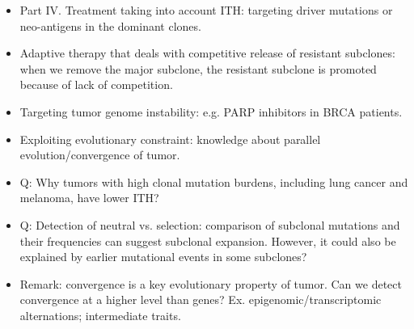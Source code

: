 \documentclass{report}
\begin{document}
\begin{itemize}
	\item Part IV. Treatment taking into account ITH: targeting driver mutations or neo-antigens in the dominant clones. 
	
	\item Adaptive therapy that deals with competitive release of resistant subclones: when we remove the major subclone, the resistant subclone is promoted because of lack of competition. 
	
	\item Targeting tumor genome instability: e.g. PARP inhibitors in BRCA patients. 
	
	\item Exploiting evolutionary constraint: knowledge about parallel evolution/convergence of tumor. 
	
	\item Q: Why tumors with high clonal mutation burdens, including lung cancer and melanoma, have lower ITH? 
	
	\item Q: Detection of neutral vs. selection: comparison of subclonal mutations and their frequencies can suggest subclonal expansion. However, it could also be explained by earlier mutational events in some subclones? 
	
	\item Remark: convergence is a key evolutionary property of tumor. Can we detect convergence at a higher level than genes? Ex. epigenomic/transcriptomic alternations; intermediate traits. 
\end{itemize}
\end{document}
